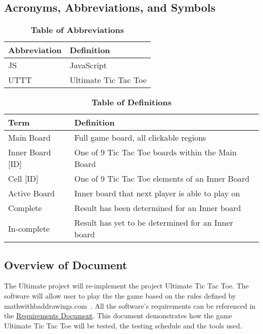 \documentclass[12pt, titlepage]{article}
\begin{document}
\subsection{Acronyms, Abbreviations, and Symbols}
	
\begin{table}[hbp]
\caption{\textbf{Table of Abbreviations}} \label{Table}

\begin{tabularx}{\textwidth}{p{3cm}X}
\toprule
\textbf{Abbreviation} & \textbf{Definition} \\
\midrule
JS & JavaScript\\
UTTT & Ultimate Tic Tac Toe\\
\bottomrule
\end{tabularx}

\end{table}

\begin{table}[!htbp]
\caption{\textbf{Table of Definitions}} \label{Table}

\begin{tabularx}{\textwidth}{p{3cm}X}
\toprule
\textbf{Term} & \textbf{Definition}\\
\midrule
Main Board & Full game board, all clickable regions \\
Inner Board [ID] & One of 9 Tic Tac Toe boards within the Main Board\\
Cell [ID] & One of 9 Tic Tac Toe elements of an Inner Board\\
Active Board & Inner board that next player is able to play on\\
Complete & Result has been determined for an Inner board \\
In-complete & Result has yet to be determined for an Inner board \\
\bottomrule
\end{tabularx}

\end{table}	

\subsection{Overview of Document}

The Ultimate  project will re-implement the project Ultimate Tic Tac Toe. The
software will allow user to play the the game based on the rules defined by
mathwithbaddrawings.com~\citep{Rules}. All the software's requirements can be
referenced in the \href{run:../SRS/SRS.pdf}{Requirements Document}. This document
demonstrates how the game Ultimate Tic Tac Toe will be tested, the testing
schedule and the tools used.
\end{document}
